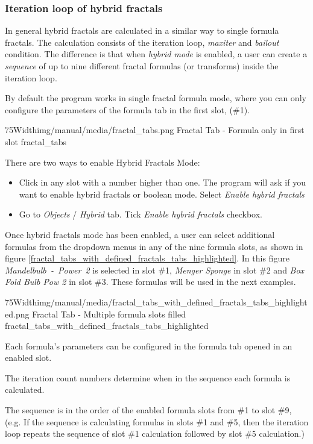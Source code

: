 \subsubsection{Iteration loop of hybrid fractals}

In general hybrid fractals are calculated in a similar way to single formula fractals.
The calculation consists of the iteration loop, \emph{maxiter} and \emph{bailout} condition. The
difference is that when \emph{hybrid mode} is enabled, a user can create a \emph{sequence} of up to nine different fractal formulas (or transforms) inside the iteration loop. 

By default the program works in single fractal formula mode, where you can only configure the parameters of the formula tab in the first slot,
(\#1). 

\simpleImageWithCaption75Width{img/manual/media/fractal_tabs.png}
{Fractal Tab - Formula only in first slot}
{fractal_tabs}

There are two ways to enable Hybrid Fractals Mode:
\begin{itemize}
	\item Click in any slot with a number higher than one. The program will ask if you want to
	enable hybrid fractals or boolean mode. Select \emph{Enable hybrid fractals}
	\item Go to \emph{Objects} / \emph{Hybrid} tab. Tick \emph{Enable hybrid fractals} checkbox.
\end{itemize}

Once hybrid fractals mode has been enabled, a user can select additional formulas from the dropdown menus in any of the nine formula slots,
as shown in figure \ref{fractal_tabs_with_defined_fractals_tabs_highlighted}.
In this figure \emph{Mandelbulb~-~Power~2} is selected in slot \#1, \emph{Menger Sponge}
in slot \#2 and \emph{Box Fold Bulb Pow 2} in slot \#3. These formulas will be
used in the next examples.

\simpleImageWithCaption75Width{img/manual/media/fractal_tabs_with_defined_fractals_tabs_highlighted.png}
{Fractal Tab - Multiple formula slots filled}
{fractal_tabs_with_defined_fractals_tabs_highlighted}

Each formula's parameters can be configured in the formula tab opened in an enabled slot.


The iteration count numbers determine when in the sequence each formula is calculated.

The sequence is in the order of the enabled formula slots from \#1 to slot \#9, (e.g. If the sequence is calculating formulas in slots
\#1 and \#5, then the iteration loop repeats the sequence of slot \#1 calculation followed by slot
\#5 calculation.)

